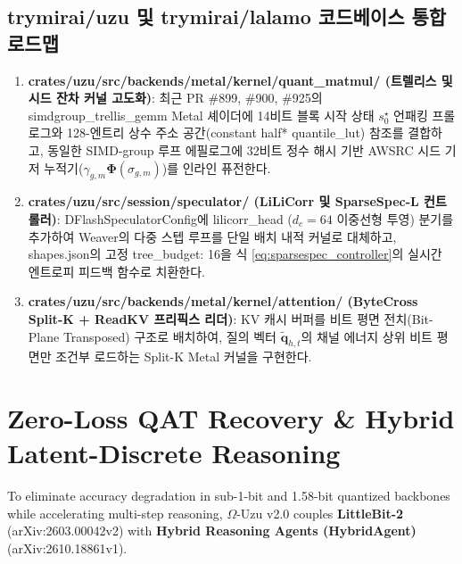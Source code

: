 \documentclass[10pt,a4paper]{article}
\begin{document}
\subsection{\textsf{trymirai/uzu} 및 \textsf{trymirai/lalamo} 코드베이스 통합 로드맵}
\begin{enumerate}\setlength{\itemsep}{3pt}\setlength{\parskip}{0pt}
  \item \textbf{\textsf{crates/uzu/src/backends/metal/kernel/quant\_matmul/} (트렐리스 및 시드 잔차 커널 고도화)}: 최근 PR \#899, \#900, \#925의 \textsf{simdgroup\_trellis\_gemm} Metal 셰이더에 14비트 블록 시작 상태 $s_0^\star$ 언패킹 프롤로그와 128-엔트리 상수 주소 공간(\textsf{constant half* quantile\_lut}) 참조를 결합하고, 동일한 SIMD-group 루프 에필로그에 32비트 정수 해시 기반 \textsf{AWSRC} 시드 기저 누적기($\gamma_{g,m}\mathbf{\Phi}(\sigma_{g,m})$)를 인라인 퓨전한다.
  \item \textbf{\textsf{crates/uzu/src/session/speculator/} (\textsf{LiLiCorr} 및 \textsf{SparseSpec-L} 컨트롤러)}: \textsf{DFlashSpeculatorConfig}에 \textsf{lilicorr\_head} ($d_c=64$ 이중선형 투영) 분기를 추가하여 \textsf{Weaver}의 다중 스텝 루프를 단일 배치 내적 커널로 대체하고, \textsf{shapes.json}의 고정 \textsf{tree\_budget: 16}을 식 \eqref{eq:sparsespec_controller}의 실시간 엔트로피 피드백 함수로 치환한다.
  \item \textbf{\textsf{crates/uzu/src/backends/metal/kernel/attention/} (\textsf{ByteCross} Split-K + \textsf{ReadKV} 프리픽스 리더)}: KV 캐시 버퍼를 비트 평면 전치(Bit-Plane Transposed) 구조로 배치하여, 질의 벡터 $\widetilde{\mathbf{q}}_{h,t}$의 채널 에너지 상위 비트 평면만 조건부 로드하는 Split-K Metal 커널을 구현한다.
\end{enumerate}


\section{Zero-Loss QAT Recovery \& Hybrid Latent-Discrete Reasoning}

To eliminate accuracy degradation in sub-1-bit and 1.58-bit quantized backbones while accelerating multi-step reasoning, $\Omega$-Uzu v2.0 couples \textbf{LittleBit-2}~\cite{littlebit22026} (arXiv:2603.00042v2) with \textbf{Hybrid Reasoning Agents (HybridAgent)}~\cite{hybridagent2026} (arXiv:2610.18861v1).
\end{document}
